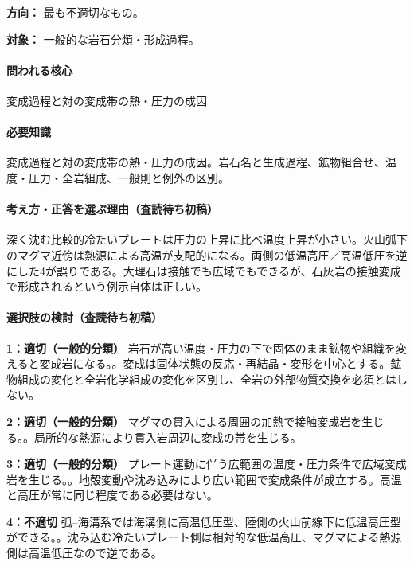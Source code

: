 \noindent\textbf{方向：} 最も不適切なもの。\par

\noindent\textbf{対象：} 一般的な岩石分類・形成過程。\par

\paragraph{問われる核心} 変成過程と対の変成帯の熱・圧力の成因

\paragraph{必要知識} 変成過程と対の変成帯の熱・圧力の成因。岩石名と生成過程、鉱物組合せ、温度・圧力・全岩組成、一般則と例外の区別。

\paragraph{考え方・正答を選ぶ理由（査読待ち初稿）} 深く沈む比較的冷たいプレートは圧力の上昇に比べ温度上昇が小さい。火山弧下のマグマ近傍は熱源による高温が支配的になる。両側の低温高圧／高温低圧を逆にした4が誤りである。大理石は接触でも広域でもできるが、石灰岩の接触変成で形成されるという例示自体は正しい。

\paragraph{選択肢の検討（査読待ち初稿）}\mbox{}\par

\noindent\textbf{1：適切（一般的分類）} 岩石が高い温度・圧力の下で固体のまま鉱物や組織を変えると変成岩になる。。変成は固体状態の反応・再結晶・変形を中心とする。鉱物組成の変化と全岩化学組成の変化を区別し、全岩の外部物質交換を必須とはしない。\par

\noindent\textbf{2：適切（一般的分類）} マグマの貫入による周囲の加熱で接触変成岩を生じる。。局所的な熱源により貫入岩周辺に変成の帯を生じる。\par

\noindent\textbf{3：適切（一般的分類）} プレート運動に伴う広範囲の温度・圧力条件で広域変成岩を生じる。。地殻変動や沈み込みにより広い範囲で変成条件が成立する。高温と高圧が常に同じ程度である必要はない。\par

\noindent\textbf{4：不適切} 弧–海溝系では海溝側に高温低圧型、陸側の火山前線下に低温高圧型ができる。。沈み込む冷たいプレート側は相対的な低温高圧、マグマによる熱源側は高温低圧なので逆である。\par

